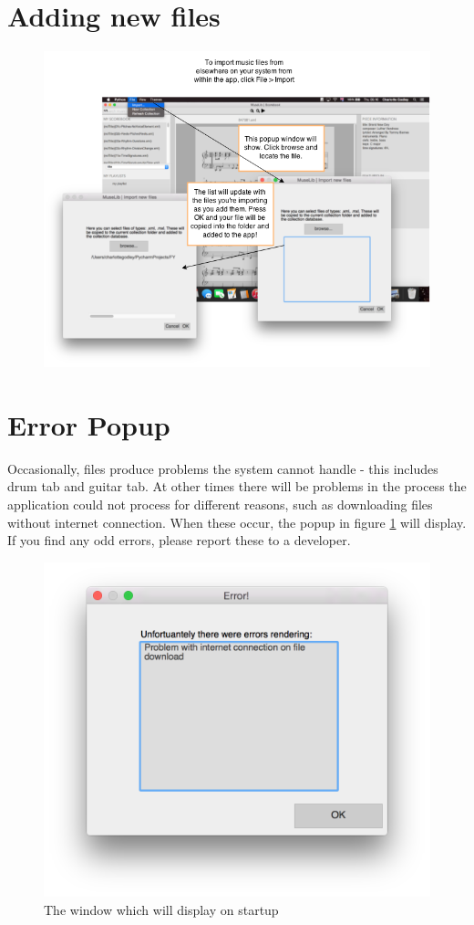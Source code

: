 \section{Adding new files}
\begin{figure}[H]
\centering
\includegraphics[width=500pt]{import_files}
\end{figure}

\section{Error Popup}
Occasionally, files produce problems the system cannot handle - this includes drum tab and guitar tab. At other times there will be problems in the process the application could not process for different reasons, such as downloading files without internet connection. When these occur, the popup in figure \ref{fig:error} will display. If you find any odd errors, please report these to a developer.
\begin{figure}[H]
\centering
\includegraphics[width=500pt]{errorpop}
\caption{The window which will display on startup}
\label{fig:error}	
\end{figure}

